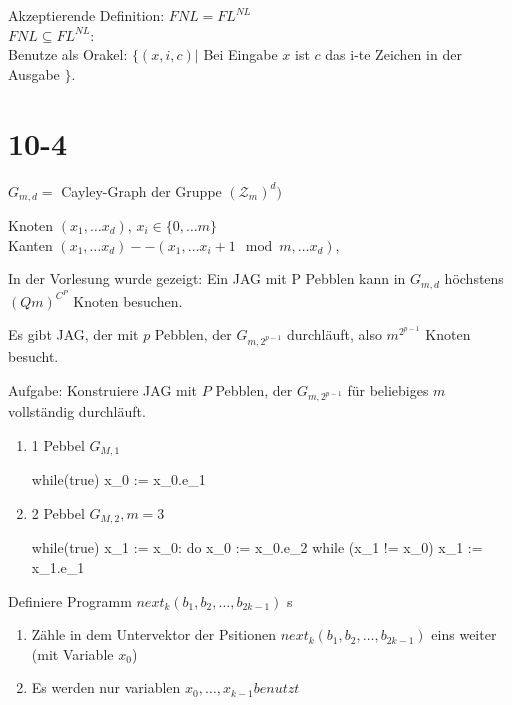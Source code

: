 \documentclass[12pt, oneside, a4paper, numbers=enddot, abstracton, parskip=full]{scrreprt}
\begin{document}
Akzeptierende Definition: $FNL = FL^{NL}$ \\
$FNL\subseteq FL^{NL}$:\\
Benutze als Orakel: $\{ (x,i,c)|$ Bei Eingabe $x$ ist $c$ das i-te Zeichen in der Ausgabe $\}$.



\section{10-4}

$G_{m,d} = $ Cayley-Graph der Gruppe $(\mathcal{Z}_m)^d)$

Knoten $(x_1, \dots x_d)$, $x_i \in \{0, \dots m \}$
\\
Kanten $(x_1, \dots x_d) -- (x_1, \dots x_i + 1 \mod m, \dots x_d)$,

In der Vorlesung wurde gezeigt: Ein JAG mit P Pebblen  kann in $G_{m,d}$ höchstens $(Qm)^{C^P}$ Knoten besuchen.

Es gibt JAG, der mit $p$ Pebblen, der $G_{m,2^{p-1}}$ durchläuft, also $m^{2^{p-1}}$ Knoten besucht.

Aufgabe: Konstruiere JAG mit $P$ Pebblen, der $G_{m,2^{p-1}}$ für beliebiges $m$ vollständig durchläuft.

\begin{enumerate}
\item 1 Pebbel $G_{M,1}$
  \begin{codebox}[javascript]
    while(true) {
      x_0 := x_0.e_1
      }
  \end{codebox}
\item 2 Pebbel $G_{M,2}, m=3$
  \begin{codebox}[javascript]
    while(true) {
      x_1 := x_0:
      do{
        x_0 := x_0.e_2        
      } while (x_1 != x_0)
      x_1 := x_1.e_1
    }
  \end{codebox}  
\end{enumerate}


Definiere Programm $next_k(b_1,b_2,\dots, b_{2 k-1})$ s

\begin{enumerate}
\item Zähle in dem Untervektor der Psitionen
  $next_k(b_1,b_2,\dots,b_{2 k-1})$ eins weiter (mit Variable $x_0$)
\item Es werden nur variablen $x_0, \dots, x_{k-1} benutzt$
\end{enumerate}
\end{document}
